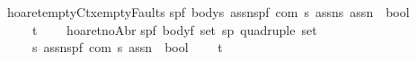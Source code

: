 \begin{isabellebody}
\isanewline
{\isachardoublequoteopen}{\isacharunderscore}hoaret{\isacharunderscore}emptyCtx{\isacharunderscore}emptyFaults{\isachardoublequoteclose}{\isacharcolon}{\isacharcolon}\isanewline
{\isachardoublequoteopen}{\isacharbrackleft}{\isacharparenleft}{\isacharprime}s{\isacharcomma}{\isacharprime}p{\isacharcomma}{\isacharprime}f{\isacharparenright}\ body{\isacharcomma}{\isacharprime}s\ assn{\isacharcomma}{\isacharparenleft}{\isacharprime}s{\isacharcomma}{\isacharprime}p{\isacharcomma}{\isacharprime}f{\isacharparenright}\ com{\isacharcomma}\ {\isacharprime}s\ assn{\isacharcomma}{\isacharprime}s\ assn{\isacharbrackright}\ {\isacharequal}{\isachargreater}\ bool{\isachardoublequoteclose}\isanewline
\ \ \ \ {\isacharparenleft}{\isachardoublequoteopen}{\isacharparenleft}{}{\isacharunderscore}{\isacharslash}{\isasymturnstile}\isactrlsub t\ {\isacharparenleft}{\isacharunderscore}{\isacharslash}\ {\isacharparenleft}{\isacharunderscore}{\isacharparenright}{\isacharslash}\ {\isacharunderscore}{\isacharcomma}{\isacharslash}{\isacharunderscore}{\isacharparenright}{\isacharparenright}{\isachardoublequoteclose}\ {\isacharbrackleft}{}{}{\isacharcomma}{}{}{}{}{\isacharcomma}{}{}{\isacharcomma}{}{}{}{}{\isacharcomma}{}{}{}{}{\isacharbrackright}{}{}{\isacharparenright}\isanewline
\isanewline
{\isachardoublequoteopen}{\isacharunderscore}hoaret{\isacharunderscore}noAbr{\isachardoublequoteclose}{\isacharcolon}{\isacharcolon}\isanewline
{\isachardoublequoteopen}{\isacharbrackleft}{\isacharparenleft}{\isacharprime}s{\isacharcomma}{\isacharprime}p{\isacharcomma}{\isacharprime}f{\isacharparenright}\ body{\isacharcomma}{\isacharprime}f\ set{\isacharcomma}\ {\isacharparenleft}{\isacharprime}s{\isacharcomma}{\isacharprime}p{\isacharparenright}\ quadruple\ set{\isacharcomma}\isanewline
\ \ \ \ {\isacharprime}s\ assn{\isacharcomma}{\isacharparenleft}{\isacharprime}s{\isacharcomma}{\isacharprime}p{\isacharcomma}{\isacharprime}f{\isacharparenright}\ com{\isacharcomma}\ {\isacharprime}s\ assn{\isacharbrackright}\ {\isacharequal}{\isachargreater}\ bool{\isachardoublequoteclose}\isanewline
\ \ \ \ {\isacharparenleft}{\isachardoublequoteopen}{\isacharparenleft}{}{\isacharunderscore}{\isacharcomma}{\isacharunderscore}{\isacharslash}{\isasymturnstile}\isactrlsub t\isactrlbsub {\isacharprime}{\isacharslash}{\isacharunderscore}\isactrlesub \ {\isacharparenleft}{\isacharunderscore}{\isacharslash}\ {\isacharparenleft}{\isacharunderscore}{\isacharparenright}{\isacharslash}\ {\isacharunderscore}{\isacharparenright}{\isacharparenright}{\isachardoublequoteclose}\ {\isacharbrackleft}{}{}{\isacharcomma}{}{}{\isacharcomma}{}{}{\isacharcomma}{}{}{}{}{\isacharcomma}{}{}{\isacharcomma}{}{}{}{}{\isacharbrackright}{}{}{\isacharparenright}\isanewline

\end{isabellebody}
